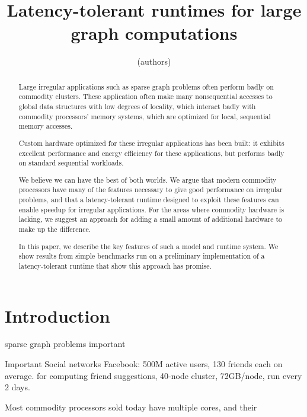 \documentclass{acm_proc_article-sp}
\begin{document}
\title{Latency-tolerant runtimes for large graph computations}

\author{
(authors)
}

\maketitle
\begin{abstract}

  Large irregular applications such as sparse graph problems often
  perform badly on commodity clusters. These application often make
  many nonsequential accesses to global data structures with low
  degrees of locality, which interact badly with commodity processors'
  memory systems, which are optimized for local, sequential memory
  accesses.

  Custom hardware optimized for these irregular applications has been
  built: it exhibits excellent performance and energy efficiency for
  these applications, but performs badly on standard sequential
  workloads.

  We believe we can have the best of both worlds. We argue that modern
  commodity processors have many of the features necessary to give
  good performance on irregular problems, and that a latency-tolerant
  runtime designed to exploit these features can enable speedup for
  irregular applications. For the areas where commodity hardware is
  lacking, we suggest an approach for adding a small amount of
  additional hardware to make up the difference.

  In this paper, we describe the key features of such a model and
  runtime system. We show results from simple benchmarks run on a
  preliminary implementation of a latency-tolerant runtime that show
  this approach has promise.

\end{abstract}

\section{Introduction}

sparse graph problems important

Important 
Social networks
Facebook: 500M active users, 130 friends each on average. for
computing friend suggestions, 40-node cluster, 72GB/node, run every 2
days.






Most commodity processors sold today have multiple cores, and their 
\end{document}
